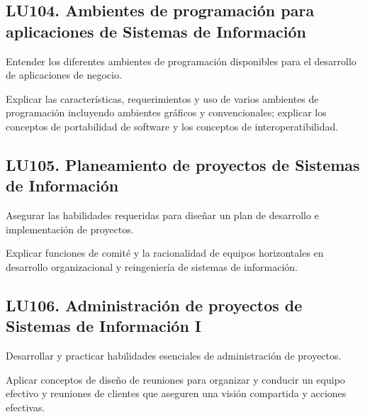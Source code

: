 \subsection{LU104. Ambientes de programación para aplicaciones de Sistemas de Información}\label{sec:LU104}
\begin{LearningUnit}
\begin{LUGoal}
\item Entender los diferentes ambientes de programación disponibles para el desarrollo de aplicaciones de negocio.
\end{LUGoal}

\begin{LUObjective}
\item Explicar las características, requerimientos y uso de varios ambientes de programación incluyendo ambientes gráficos y convencionales; explicar los conceptos de portabilidad de software y los conceptos de interoperatibilidad.
\end{LUObjective}
\end{LearningUnit}

\subsection{LU105. Planeamiento de proyectos  de Sistemas de Información}\label{sec:LU105}
\begin{LearningUnit}
\begin{LUGoal}
\item Asegurar las habilidades requeridas para diseñar un plan de desarrollo e implementación de proyectos.
\end{LUGoal}

\begin{LUObjective}
\item Explicar funciones de comité y la racionalidad de equipos horizontales en desarrollo organizacional y reingeniería de sistemas de información.
\end{LUObjective}
\end{LearningUnit}

\subsection{LU106. Administración de proyectos  de Sistemas de Información I}\label{sec:LU106}
\begin{LearningUnit}
\begin{LUGoal}
\item Desarrollar y practicar habilidades esenciales de administración de proyectos.
\end{LUGoal}

\begin{LUObjective}
\item Aplicar conceptos de diseño de reuniones para organizar y conducir un equipo efectivo y reuniones de clientes que aseguren una visión compartida y acciones efectivas.
\end{LUObjective}
\end{LearningUnit}

